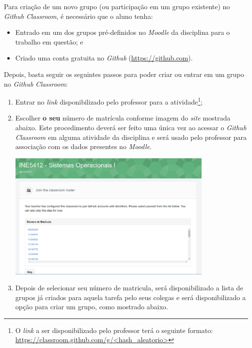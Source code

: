 \documentclass[11pt]{article}
\begin{document}
Para criação de um novo grupo (ou participação em um grupo existente) no \textit{Github Classroom}, é necessário que o aluno tenha:

\begin{itemize}
  \item Entrado em um dos grupos pré-definidos no \textit{Moodle} da disciplina para o trabalho em questão; e
  \item Criado uma conta gratuita no \textit{Github} (\url{https://github.com}).
\end{itemize}

Depois, basta seguir os seguintes passos para poder criar ou entrar em um grupo no \textit{Github Classroom}:

\begin{enumerate}
  \item Entrar no \textit{link} disponibilizado pelo professor para a atividade\footnote{O \textit{link} a ser disponibilizado pelo professor terá o seguinte formato: \url{https://classroom.github.com/g/<hash_aleatorio>}};
  \item Escolher \textbf{o seu} número de matrícula conforme imagem do \textit{site} mostrada abaixo. Este procedimento deverá ser feito uma única vez ao acessar o \textit{Github Classroom} em alguma atividade da disciplina e será usado pelo professor para associação com os dados presentes no \textit{Moodle}. 

  \begin{center}
    \vspace{0.2cm}\includegraphics[width=0.8\textwidth]{roaster}
  \end{center}

  \item Depois de selecionar seu número de matricula, será disponibilizado a lista de grupos já criados para aquela tarefa pelo seus colegas e será disponibilizado a opção para criar um grupo, como mostrado abaixo.


\end{enumerate}
\end{document}
